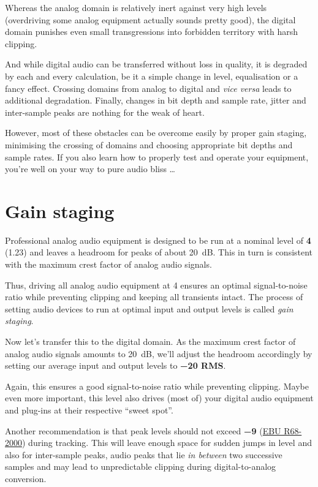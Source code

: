 Whereas the analog domain is relatively inert against very high levels
(overdriving some analog equipment actually sounds pretty good), the
digital domain punishes even small transgressions into forbidden
territory with harsh clipping.

And while digital audio can be transferred without loss in quality, it
is degraded by each and every calculation, be it a simple change in
level, equalisation or a fancy effect.  Crossing domains from analog
to digital and \emph{vice versa} leads to additional degradation.
Finally, changes in bit depth and sample rate, jitter and inter-sample
peaks are nothing for the weak of heart.

However, most of these obstacles can be overcome easily by proper gain
staging, minimising the crossing of domains and choosing appropriate
bit depths and sample rates.  If you also learn how to properly test
and operate your equipment, you're well on your way to pure audio
bliss \dots

\section{Gain staging}
\label{sec:gain_staging}

Professional analog audio equipment is designed to be run at a nominal
level of \textbf{\SI[addsign=all]{+4}{\dBu}} (\SI{1.23}{\VRMS}) and
leaves a headroom for peaks of about \SI{20}{\dB}.  This in turn is
consistent with the maximum crest factor of analog audio signals.

Thus, driving all analog audio equipment at \SI[addsign=all]{+4}{\dBu}
ensures an optimal signal-to-noise ratio while preventing clipping and
keeping all transients intact.  The process of setting audio devices
to run at optimal input and output levels is called \emph{gain
  staging}.

Now let's transfer this to the digital domain.  As the maximum crest
factor of analog audio signals amounts to \SI{20}{\dB}, we'll adjust
the headroom accordingly by setting our average input and output
levels to \textbf{\SI{-20}{\dBFS} RMS}.

Again, this ensures a good signal-to-noise ratio while preventing
clipping.  Maybe even more important, this level also drives (most of)
your digital audio equipment and plug-ins at their respective ``sweet
spot''.

Another recommendation is that peak levels should not exceed
\textbf{\SI{-9}{\dBFS}}
(\href{http://tech.ebu.ch/publications/r068}{EBU R68-2000}) during
tracking.  This will leave enough space for sudden jumps in level and
also for inter-sample peaks, audio peaks that lie \emph{in between}
two successive samples and may lead to unpredictable clipping during
digital-to-analog conversion.

